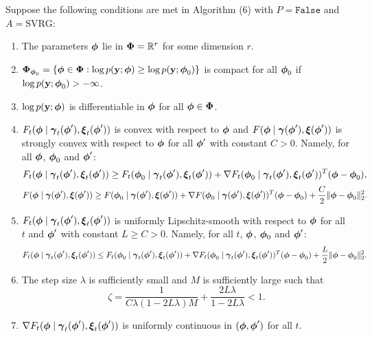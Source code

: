 \begin{theorem}

    Suppose the following conditions are met in Algorithm (6) with $P = \texttt{False}$ and $A = \text{SVRG}$:
    
    \begin{enumerate}
        \item The parameters $\boldsymbol{\phi}$ lie in $\boldsymbol{\Phi} = \mathbb{R}^r$ for some dimension $r$.
        \item $\boldsymbol{\Phi}_{\boldsymbol{\phi}_0} = \{\boldsymbol{\phi} \in \boldsymbol{\Phi}: \log p(\mathbf{y};\boldsymbol{\phi}) \geq \log p(\mathbf{y};\boldsymbol{\phi}_0)\}$ is compact for all $\boldsymbol{\phi}_0$ if $\log p(\mathbf{y};\boldsymbol{\phi}_0) > -\infty$.
        \item $\log p(\mathbf{y};\boldsymbol{\phi})$ is differentiable in $\boldsymbol{\phi}$ for all $\boldsymbol{\phi} \in \boldsymbol{\Phi}$.
        \item $F_t(\boldsymbol{\phi} \mid \boldsymbol{\gamma}_t(\boldsymbol{\phi}'), \boldsymbol{\xi}_t(\boldsymbol{\phi}'))$ is convex with respect to $\boldsymbol{\phi}$ and $F(\boldsymbol{\phi} \mid \boldsymbol{\gamma}(\boldsymbol{\phi}'), \boldsymbol{\xi}(\boldsymbol{\phi}'))$ is strongly convex with respect to $\boldsymbol{\phi}$ for all $\boldsymbol{\phi}'$ with constant $C > 0$. Namely, for all $\boldsymbol{\phi}$, $\boldsymbol{\phi}_0$ and $\boldsymbol{\phi}'$:
        \small
        \begin{equation}
            F_t(\boldsymbol{\phi} \mid \boldsymbol{\gamma}_t(\boldsymbol{\phi}'), \boldsymbol{\xi}_t(\boldsymbol{\phi}')) \geq F_t(\boldsymbol{\phi}_0 \mid \boldsymbol{\gamma}_t(\boldsymbol{\phi}'), \boldsymbol{\xi}_t(\boldsymbol{\phi}')) + \nabla F_t(\boldsymbol{\phi}_0 \mid \boldsymbol{\gamma}_t(\boldsymbol{\phi}'), \boldsymbol{\xi}_t(\boldsymbol{\phi}'))^T(\boldsymbol{\phi}-\boldsymbol{\phi}_0),
        \end{equation}
        \begin{equation}
            F(\boldsymbol{\phi} \mid \boldsymbol{\gamma}(\boldsymbol{\phi}'), \boldsymbol{\xi}(\boldsymbol{\phi}')) \geq F(\boldsymbol{\phi}_0 \mid \boldsymbol{\gamma}(\boldsymbol{\phi}'), \boldsymbol{\xi}(\boldsymbol{\phi}')) + \nabla F(\boldsymbol{\phi}_0 \mid \boldsymbol{\gamma}(\boldsymbol{\phi}'), \boldsymbol{\xi}(\boldsymbol{\phi}'))^T(\boldsymbol{\phi}-\boldsymbol{\phi}_0) + \frac{C}{2} \|\boldsymbol{\phi} - \boldsymbol{\phi}_0\|_2^2.
        \end{equation}
        \normalsize
        \item $F_t(\boldsymbol{\phi} \mid \boldsymbol{\gamma}_t(\boldsymbol{\phi}'), \boldsymbol{\xi}_t(\boldsymbol{\phi}'))$ is uniformly Lipschitz-smooth with respect to $\boldsymbol{\phi}$ for all $t$ and $\boldsymbol{\phi}'$ with constant $L \geq C > 0$. Namely, for all $t$, $\boldsymbol{\phi}$, $\boldsymbol{\phi}_0$ and $\boldsymbol{\phi}'$:
        \small
        \begin{equation}
            F_t(\boldsymbol{\phi} \mid \boldsymbol{\gamma}_t(\boldsymbol{\phi}'), \boldsymbol{\xi}_t(\boldsymbol{\phi}')) \leq F_t(\boldsymbol{\phi}_0 \mid \boldsymbol{\gamma}_t(\boldsymbol{\phi}'), \boldsymbol{\xi}_t(\boldsymbol{\phi}')) + \nabla F_t(\boldsymbol{\phi}_0 \mid \boldsymbol{\gamma}_t(\boldsymbol{\phi}'), \boldsymbol{\xi}_t(\boldsymbol{\phi}'))^T(\boldsymbol{\phi} - \boldsymbol{\phi}_0) + \frac{L}{2} \| \boldsymbol{\phi} - \boldsymbol{\phi}_0 \|_2^2.
        \end{equation}
        \normalsize
        \item The step size $\lambda$ is sufficiently small and $M$ is sufficiently large such that
        \begin{equation}
            \zeta = \frac{1}{C \lambda(1-2L\lambda)M} + \frac{2L\lambda}{1-2L\lambda} < 1.
        \end{equation}
        \item $\nabla F_t(\boldsymbol{\phi} \mid \boldsymbol{\gamma}_t(\boldsymbol{\phi}'), \boldsymbol{\xi}_t(\boldsymbol{\phi}'))$ is uniformly continuous in $(\boldsymbol{\phi},\boldsymbol{\phi}')$ for all $t$.
    \end{enumerate}
    

\end{theorem}
